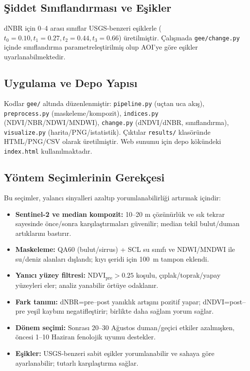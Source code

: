 \documentclass[11pt,a4paper]{article}
\begin{document}
\subsection{Şiddet Sınıflandırması ve Eşikler}
dNBR için 0--4 arası sınıflar USGS-benzeri eşiklerle (\(t_0=0.10, t_1=0.27, t_2=0.44, t_3=0.66\)) üretilmiştir. Çalışmada \texttt{gee/change.py} içinde sınıflandırma parametreleştirilmiş olup AOI'ye göre eşikler uyarlanabilmektedir.

\subsection{Uygulama ve Depo Yapısı}
Kodlar \texttt{gee/} altında düzenlenmiştir: \texttt{pipeline.py} (uçtan uca akış), \texttt{preprocess.py} (maskeleme/kompozit), \texttt{indices.py} (NDVI/NBR/NDWI/MNDWI), \texttt{change.py} (dNDVI/dNBR, sınıflandırma), \texttt{visualize.py} (harita/PNG/istatistik). Çıktılar \texttt{results/} klasöründe HTML/PNG/CSV olarak üretilmiştir. Web sunumu için depo kökündeki \texttt{index.html} kullanılmaktadır.

\subsection{Yöntem Seçimlerinin Gerekçesi}
 Bu seçimler, yalancı sinyalleri azaltıp yorumlanabilirliği artırmak içindir:
\begin{itemize}
  \item \textbf{Sentinel-2 ve median kompozit:} 10--20 m çözünürlük ve sık tekrar sayesinde önce/sonra karşılaştırmaları güvenilir; median tekil bulut/duman artıklarını bastırır.
  \item \textbf{Maskeleme:} QA60 (bulut/sirrus) + SCL su sınıfı ve NDWI/MNDWI ile su/deniz alanları dışlandı; kıyı şeridi için \SI{100}{m} tampon eklendi.
  \item \textbf{Yanıcı yüzey filtresi:} \(\mathrm{NDVI}_{\text{pre}}>0.25\) koşulu, çıplak/toprak/yapay yüzeyleri eler; analiz yanabilir örtüye odaklanır.
  \item \textbf{Fark tanımı:} dNBR=pre--post yanıklık artışını pozitif yapar; dNDVI=post--pre yeşil kaybını negatifleştirir; birlikte daha sağlam yorum sağlar.
  \item \textbf{Dönem seçimi:} Sonrası 20--30 Ağustos duman/geçici etkiler azalmışken, öncesi 1--10 Haziran fenolojik uyumu destekler.
  \item \textbf{Eşikler:} USGS-benzeri sabit eşikler yorumlanabilir ve sahaya göre ayarlanabilir; tutarlı karşılaştırma sağlar.
\end{itemize}
\end{document}
